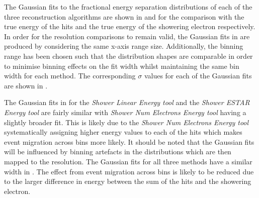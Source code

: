 The Gaussian fits to the fractional energy separation distributions of each of the three reconstruction algorithms are shown in  and  for the comparison with the true energy of the hits and the true energy of the showering electron respectively. In order for the resolution comparisons to remain valid, the Gaussian fits in  are produced by considering the same x-axis range size. Additionally, the binning range has been chosen such that the distribution shapes are comparable in order to minimise binning effects on the fit width whilst maintaining the same bin width for each method. The corresponding $\sigma$ values for each of the Gaussian fits are shown in . 

The Gaussian fits in  for the \textit{Shower Linear Energy tool} and the \textit{Shower ESTAR Energy tool} are fairly similar with \textit{Shower Num Electrons Energy tool} having a slightly broader fit. This is likely due to the \textit{Shower Num Electrons Energy tool} systematically assigning higher energy values to each of the hits which makes event migration across bins more likely. It should be noted that the Gaussian fits will be influenced by binning artefacts in the distributions which are then mapped to the resolution. 
The Gaussian fits for all three methods have a similar width in . The effect from event migration across bins is likely to be reduced due to the larger difference in energy between the sum of the hits and the showering electron. 


